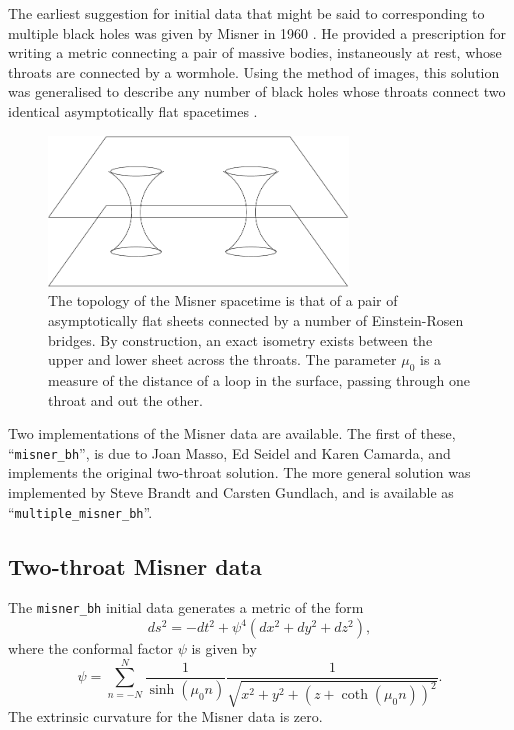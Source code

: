 \documentclass{article}
\begin{document}
The earliest suggestion for initial data that might be said to
corresponding to multiple black holes was given by Misner in 1960
\cite{CactusEinstein_IDAnalyticBH_misner:1960}. He provided a prescription for writing a metric
connecting a pair of massive bodies, instaneously at rest, whose
throats are connected by a wormhole. Using the method of images, this
solution was generalised to describe any number of black holes whose
throats connect two identical asymptotically flat spacetimes
\cite{CactusEinstein_IDAnalyticBH_misner:1963}.
\begin{figure}
  \centering
  \includegraphics[height=40mm]{misner}
  \caption{The topology of the Misner spacetime is that of a pair of
  asymptotically flat sheets connected by a number of Einstein-Rosen
  bridges. By construction, an exact isometry exists between the upper
  and lower sheet across the throats. The parameter $\mu_0$ is a
  measure of the distance of a loop in the surface, passing through
  one throat and out the other.}
\end{figure}

Two implementations of the Misner data are available. The first of
these, ``\texttt{misner\_bh}'', is due to Joan Masso, Ed Seidel and
Karen Camarda, and implements the original two-throat solution. The
more general solution was implemented by Steve Brandt and Carsten
Gundlach, and is available as ``\texttt{multiple\_misner\_bh}''.

\subsection{Two-throat Misner data}

The \texttt{misner\_bh} initial data generates a metric of the form
\begin{equation}
  ds^2 = -dt^2 + \psi^4 (dx^2 + dy^2 + dz^2),
\end{equation}
where the conformal factor $\psi$ is given by
\begin{equation}
  \psi = \sum^N_{n=-N}
  \frac{1}{\sinh(\mu_0 n)}
  \frac{1}{\sqrt{x^2 + y^2 + (z + \coth(\mu_0 n))^2}}.
\end{equation}
The extrinsic curvature for the Misner data is zero.
\end{document}
